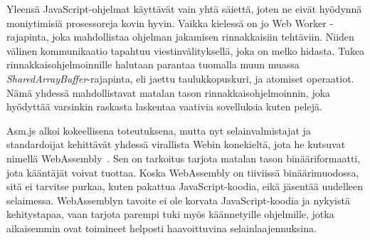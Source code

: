 Yleensä JavaScript-ohjelmat käyttävät vain yhtä säiettä, joten ne eivät hyödynnä moniytimisiä prosessoreja kovin hyvin. Vaikka kielessä on jo Web Worker -rajapinta, joka mahdollistaa ohjelman jakamisen rinnakkaisiin tehtäviin. Niiden välinen kommunikaatio tapahtuu viestinvälityksellä, joka on melko hidasta. Tukea rinnakkaisohjelmoinnille halutaan parantaa tuomalla muun muassa \textit{SharedArrayBuffer}-rajapinta, eli jaettu taulukkopuskuri, ja atomiset operaatiot. Nämä yhdessä mahdollistavat matalan tason rinnakkaisohjelmoinnin, joka hyödyttää varsinkin raskasta laskentaa vaativia sovelluksia kuten pelejä.

Asm.js alkoi kokeellisena toteutuksena, mutta nyt selainvalmistajat ja standardoijat kehittävät yhdessä virallista Webin konekieltä, jota he kutsuvat nimellä WebAssembly~\cite{webassembly}. Sen on tarkoitus tarjota matalan tason binääriformaatti, jota kääntäjät voivat tuottaa. Koska WebAssembly on tiiviissä binäärimuodossa, sitä ei tarvitse purkaa, kuten pakattua JavaScript-koodia, eikä jäsentää uudelleen selaimessa. WebAssemblyn tavoite ei ole korvata JavaScript-koodia ja nykyistä kehitystapaa, vaan tarjota parempi tuki myös käännetyille ohjelmille, jotka aikaisemmin ovat toimineet helposti haavoittuvina selainlaajennuksina.

